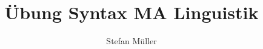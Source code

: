 

\title{Übung Syntax MA Linguistik}


\author{Stefan Müller}





\huberlintitlepage


\newtoggle{ba-linguistik}\togglefalse{ba-linguistik}
















